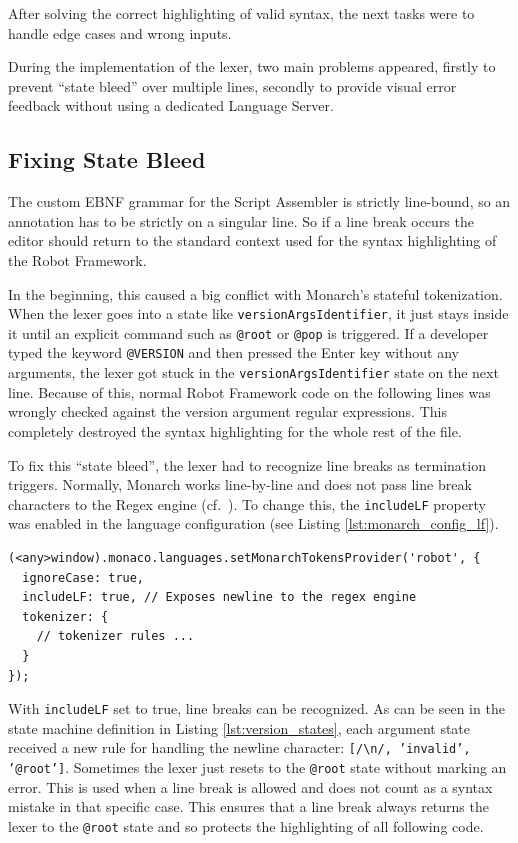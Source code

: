 After solving the correct highlighting of valid syntax, the next tasks were to handle edge cases and wrong inputs. 

During the implementation of the lexer, two main problems appeared, firstly to prevent ``state bleed'' over multiple lines,  secondly to provide visual error feedback without using a dedicated Language Server.

\subsection{Fixing State Bleed}

The custom EBNF grammar for the Script Assembler is strictly line-bound, so an annotation has to be strictly on a singular line. So if a line break occurs the editor should return to the standard context used for the syntax highlighting of the Robot Framework.

In the beginning, this caused a big conflict with Monarch's stateful tokenization. When the lexer goes into a state like \texttt{versionArgsIdentifier}, it just stays inside it until an explicit command such as \texttt{@root} or \texttt{@pop} is triggered. If a developer typed the keyword \texttt{@VERSION} and then pressed the Enter key without any arguments, the lexer got stuck in the \texttt{versionArgsIdentifier} state on the next line. Because of this, normal Robot Framework code on the following lines was wrongly checked against the version argument regular expressions. This completely destroyed the syntax highlighting for the whole rest of the file.

To fix this ``state bleed'', the lexer had to recognize line breaks as termination triggers. Normally, Monarch works line-by-line and does not pass line break characters to the Regex engine (cf.~\cite[pp.~8-9]{Krieken2023DerivingGrammars}). To change this, the \texttt{includeLF} property was enabled in the language configuration (see Listing \ref{lst:monarch_config_lf}).

\begin{lstlisting}[caption={\texttt{includeLF} in the Monarch config}, label={lst:monarch_config_lf}]
(<any>window).monaco.languages.setMonarchTokensProvider('robot', {
  ignoreCase: true,
  includeLF: true, // Exposes newline to the regex engine
  tokenizer: {
    // tokenizer rules ...
  }
});
\end{lstlisting}

With \texttt{includeLF} set to true, line breaks can be recognized. As can be seen in the state machine definition in Listing \ref{lst:version_states}, each argument state received a new rule for handling the newline character: \texttt{[/\textbackslash n/, 'invalid', '@root']}. Sometimes the lexer just resets to the \texttt{@root} state without marking an error. This is used when a line break is allowed and does not count as a syntax mistake in that specific case. This ensures that a line break always returns the lexer to the \texttt{@root} state and so protects the highlighting of all following code.

